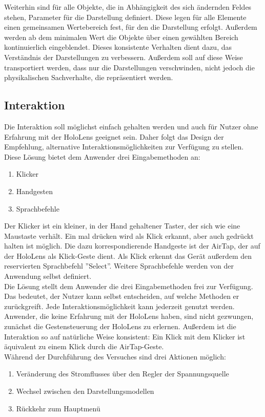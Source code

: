 Weiterhin sind für alle Objekte, die in Abhängigkeit des sich ändernden Feldes stehen, Parameter für die Darstellung definiert. Diese legen für alle Elemente einen gemeinsamen Wertebereich fest, für den die Darstellung erfolgt. Außerdem werden ab dem minimalen Wert die Objekte über einen gewählten Bereich kontinuierlich eingeblendet. Dieses konsistente Verhalten dient dazu, das Verständnis der Darstellungen zu verbessern. Außerdem soll auf diese Weise transportiert werden, dass nur die Darstellungen verschwinden, nicht jedoch die physikalischen Sachverhalte, die repräsentiert werden.\\

\subsection{Interaktion}
\label{sec-4-4}
Die Interaktion soll möglichst einfach gehalten werden und auch für Nutzer ohne Erfahrung mit der HoloLens geeignet sein. Daher folgt das Design der Empfehlung, alternative Interaktionsmöglichkeiten zur Verfügung zu stellen. Diese Lösung bietet dem Anwender drei Eingabemethoden an:
\begin{enumerate}
	\setlength{\itemsep}{-5pt}
	\item Klicker
	\item Handgesten
	\item Sprachbefehle
\end{enumerate}

Der Klicker ist ein kleiner, in der Hand gehaltener Taster, der sich wie eine Maustaste verhält. Ein mal drücken wird als Klick erkannt, aber auch gedrückt halten ist möglich.
Die dazu korrespondierende Handgeste ist der AirTap, der auf der HoloLens als Klick-Geste dient. Als Klick erkennt das Gerät außerdem den reservierten Sprachbefehl ''Select''. Weitere Sprachbefehle werden von der Anwendung selbst definiert.\\

Die Lösung stellt dem Anwender die drei Eingabemethoden frei zur Verfügung. Das bedeutet, der Nutzer kann selbst entscheiden, auf welche Methoden er zurückgreift. Jede Interaktionsmöglichkeit kann jederzeit genutzt werden. Anwender, die keine Erfahrung mit der HoloLens haben, sind nicht gezwungen, zunächst die Gestensteuerung der HoloLens zu erlernen. Außerdem ist die Interaktion so auf natürliche Weise konsistent: Ein Klick mit dem Klicker ist äquivalent zu einem Klick durch die AirTap-Geste.\\

Während der Durchführung des Versuches sind drei Aktionen möglich:
\begin{enumerate}[topsep=-2px]
	\setlength{\itemsep}{-5pt}
	\item Veränderung des Stromflusses über den Regler der Spannungsquelle
	\item Wechsel zwischen den Darstellungsmodellen
	\item Rückkehr zum Hauptmenü
\end{enumerate}
\vspace{8px}

